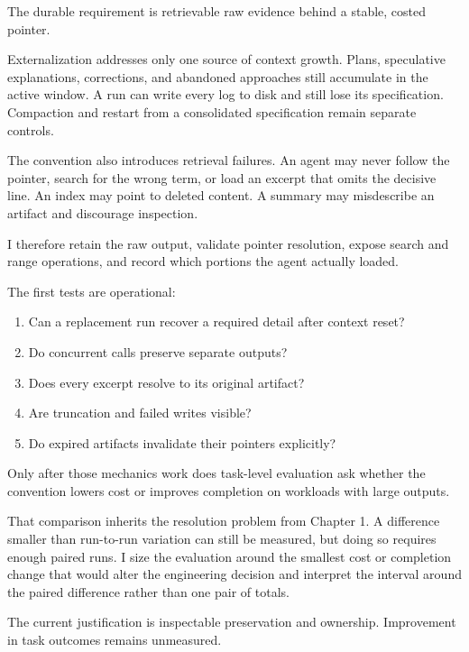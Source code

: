 The durable requirement is retrievable raw evidence behind a stable, costed pointer.

Externalization addresses only one source of context growth. Plans, speculative explanations, corrections, and abandoned approaches still accumulate in the active window. A run can write every log to disk and still lose its specification. Compaction and restart from a consolidated specification remain separate controls.

The convention also introduces retrieval failures. An agent may never follow the pointer, search for the wrong term, or load an excerpt that omits the decisive line. An index may point to deleted content. A summary may misdescribe an artifact and discourage inspection.

I therefore retain the raw output, validate pointer resolution, expose search and range operations, and record which portions the agent actually loaded.


The first tests are operational:

\begin{enumerate}
\def\labelenumi{\arabic{enumi}.}
\tightlist
\item
  Can a replacement run recover a required detail after context reset?
\item
  Do concurrent calls preserve separate outputs?
\item
  Does every excerpt resolve to its original artifact?
\item
  Are truncation and failed writes visible?
\item
  Do expired artifacts invalidate their pointers explicitly?
\end{enumerate}

Only after those mechanics work does task-level evaluation ask whether the convention lowers cost or improves completion on workloads with large outputs.

That comparison inherits the resolution problem from Chapter 1. A difference smaller than run-to-run variation can still be measured, but doing so requires enough paired runs. I size the evaluation around the smallest cost or completion change that would alter the engineering decision and interpret the interval around the paired difference rather than one pair of totals.

The current justification is inspectable preservation and ownership. Improvement in task outcomes remains unmeasured.

